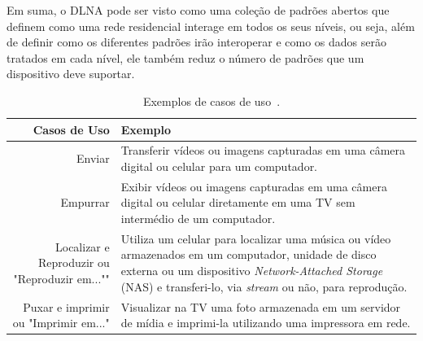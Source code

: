 Em suma, o DLNA pode ser visto como uma coleção de padrões abertos que definem como uma rede residencial interage em todos os seus níveis, ou seja, além de definir como os diferentes padrões irão interoperar e como os dados serão tratados em cada nível, ele também reduz o número de padrões que um dispositivo deve suportar.

\begin{table}
	\begin{center}
		\begin{tabular}{rl}
		\hline
		\textbf{Casos de Uso} & \textbf{Exemplo}																\\
		\hline
		Enviar & Transferir vídeos ou imagens capturadas em uma câmera digital ou celular para um computador.	\\
		\hline
		Empurrar & Exibir vídeos ou imagens capturadas em uma câmera digital ou celular diretamente em uma TV sem intermédio de um computador. \\
		\hline
		Localizar e Reproduzir ou "Reproduzir em..."" & Utiliza um celular para localizar uma música ou vídeo armazenados em um computador, unidade de disco externa ou um dispositivo \emph{Network-Attached Storage} (NAS) e transferi-lo, via \emph{stream} ou não, para reprodução. \\
		\hline
		Puxar e imprimir ou "Imprimir em..." & Visualizar na TV uma foto armazenada em um servidor de mídia e imprimi-la utilizando uma impressora em rede. \\
		\hline
		\end{tabular}
	\end{center}
	\caption{Exemplos de casos de uso~\cite{dlnahdvideostreaming}.}
	\label{tab:casosdeuso_dlna}
\end{table}

